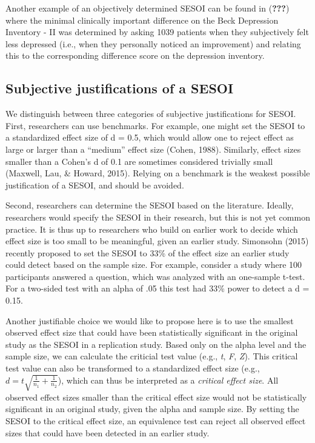 \documentclass[english,man]{apa6}
\theoremstyle{definition}
\theoremstyle{definition}
\theoremstyle{definition}
\theoremstyle{remark}
\begin{document}
Another example of an objectively determined SESOI can be found in
({\textbf{???}}) where the minimal clinically important difference on
the Beck Depression Inventory - II was determined by asking 1039
patients when they subjectively felt less depressed (i.e., when they
personally noticed an improvement) and relating this to the
corresponding difference score on the depression inventory.

\subsection{Subjective justifications of a
SESOI}\label{subjective-justifications-of-a-sesoi}

We distinguish between three categories of subjective justifications for
SESOI. First, researchers can use benchmarks. For example, one might set
the SESOI to a standardized effect size of d = 0.5, which would allow
one to reject effect as large or larger than a \enquote{medium} effect
size (Cohen, 1988). Similarly, effect sizes smaller than a Cohen's d of
0.1 are sometimes considered trivially small (Maxwell, Lau, \& Howard,
2015). Relying on a benchmark is the weakest possible justification of a
SESOI, and should be avoided.

Second, researchers can determine the SESOI based on the literature.
Ideally, researchers would specify the SESOI in their research, but this
is not yet common practice. It is thus up to researchers who build on
earlier work to decide which effect size is too small to be meaningful,
given an earlier study. Simonsohn (2015) recently proposed to set the
SESOI to 33\% of the effect size an earlier study could detect based on
the sample size. For example, consider a study where 100 participants
answered a question, which was analyzed with an one-sample t-test. For a
two-sided test with an alpha of .05 this test had 33\% power to detect a
d = 0.15.

Another justifiable choice we would like to propose here is to use the
smallest observed effect size that could have been statistically
significant in the original study as the SESOI in a replication study.
Based only on the alpha level and the sample size, we can calculate the
criticial test value (e.g., \emph{t}, \emph{F}, \emph{Z}). This critical
test value can also be transformed to a standardized effect size (e.g.,
\(d = t \sqrt { \frac { 1} { n _ { 1} } + \frac { 1} { n _ { 2} } }\)),
which can thus be interpreted as a \emph{critical effect size}. All
observed effect sizes smaller than the critical effect size would not be
statistically significant in an original study, given the alpha and
sample size. By setting the SESOI to the critical effect size, an
equivalence test can reject all observed effect sizes that could have
been detected in an earlier study.
\end{document}
